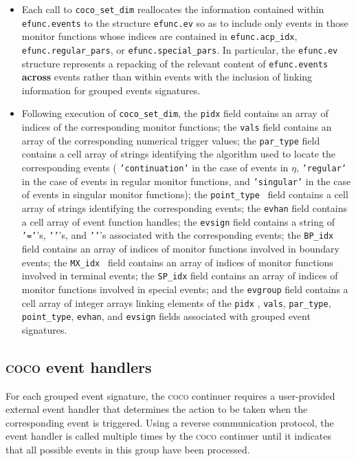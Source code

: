 \documentclass{article}
\begin{document}
\begin{itemize}
\item Each call to \texttt{coco\_set\_dim} reallocates the information
contained within \texttt{efunc.events} to the structure \texttt{efunc.ev} so
as to include only events in those monitor functions whose indices are
contained in \texttt{efunc.acp\_idx}, \texttt{efunc.regular\_pars}, or 
\texttt{efunc.special\_pars}. In particular, the \texttt{efunc.ev} structure
represents a repacking of the relevant content of \texttt{efunc.events} 
\textbf{across} events rather than within events with the inclusion of
linking information for grouped events signatures.

\item Following execution of \texttt{coco\_set\_dim}, the \texttt{pidx}
field contains an array of indices of the corresponding monitor functions;
the \texttt{vals} field contains an array of the corresponding numerical
trigger values; the \texttt{par\_type} field contains a cell array of
strings identifying the algorithm used to locate the corresponding events (%
\texttt{'continuation'} in the case of events in $\eta $, \texttt{'regular'}
in the case of events in regular monitor functions, and \texttt{'singular'}
in the case of events in singular monitor functions); the \texttt{point\_type%
} field contains a cell array of strings identifying the corresponding
events; the \texttt{evhan} field contains a cell array of event function
handles; the \texttt{evsign} field contains a string of \texttt{'='}'s, 
\texttt{'\TEXTsymbol{<}'}'s, and \texttt{'\TEXTsymbol{>}'}'s associated with
the corresponding events; the \texttt{BP\_idx} field contains an array of
indices of monitor functions involved in boundary events; the \texttt{MX\_idx%
} field contains an array of indices of monitor functions involved in
terminal events; the \texttt{SP\_idx} field contains an array of indices of
monitor functions involved in special events; and the \texttt{evgroup} field
contains a cell array of integer arrays linking elements of the \texttt{pidx}%
, \texttt{vals}, \texttt{par\_type}, \texttt{point\_type}, \texttt{evhan},
and \texttt{evsign} fields associated with grouped event signatures.
\end{itemize}

\subsection{\textsc{coco} event handlers}

For each grouped event signature, the \textsc{coco} continuer requires a
user-provided external event handler that determines the action to be taken
when the corresponding event is triggered. Using a reverse communication
protocol, the event handler is called multiple times by the \textsc{coco}
continuer until it indicates that all possible events in this group have
been processed.
\end{document}
